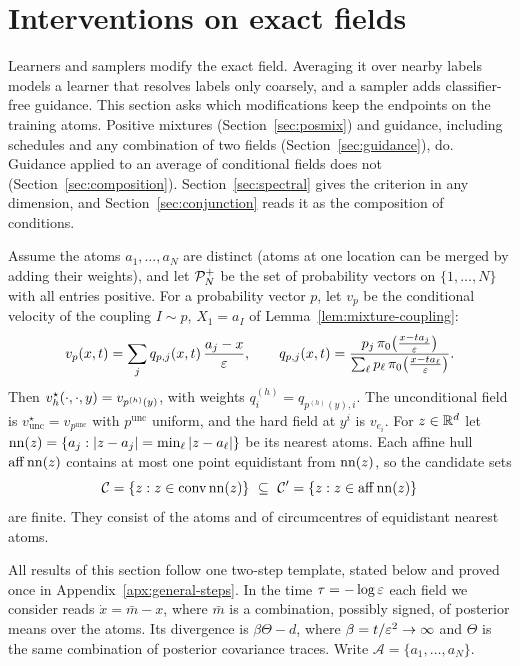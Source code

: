\documentclass{article} %
\theoremstyle{plain}
\theoremstyle{definition}
\theoremstyle{remark}
\begin{document}
\section{Interventions on exact fields}
\label{sec:intervention-atomicity}

Learners and samplers modify the exact field. Averaging it over nearby labels models a learner
that resolves labels only coarsely, and a sampler adds classifier-free guidance. This section asks
which modifications keep the endpoints on the training atoms. Positive mixtures
(Section~\ref{sec:posmix}) and guidance, including schedules and any combination of two fields
(Section~\ref{sec:guidance}), do. Guidance applied to an average of conditional fields does not
(Section~\ref{sec:composition}). Section~\ref{sec:spectral} gives the criterion in any dimension,
and Section~\ref{sec:conjunction} reads it as the composition of conditions.

Assume the atoms $a_1,\dots,a_N$ are distinct (atoms at one location can be merged by adding
their weights), and let $\mathcal{P}_N^{+}$ be the set of probability vectors on $\{1,\dots,N\}$ with all
entries positive. For a probability vector $p$, let $v_p$ be the conditional velocity of the
coupling $I\sim p$, $X_1=a_I$ of Lemma~\ref{lem:mixture-coupling}:
\begin{equation}
v_p(x,t)=\sum_j q_{p,j}(x,t)\,\frac{a_j-x}{\varepsilon},\qquad
q_{p,j}(x,t)=\frac{p_j\,\pi_0\big(\tfrac{x-ta_j}{\varepsilon}\big)}
{\sum_\ell p_\ell\,\pi_0\big(\tfrac{x-ta_\ell}{\varepsilon}\big)}.
\label{eq:prior-field}
\end{equation}
Then $v_h^\star(\cdot,\cdot,y)=v_{p^{(h)}(y)}$, with weights $q^{(h)}_i=q_{p^{(h)}(y),i}$. The
unconditional field is $v_{\mathrm{unc}}^\star=v_{p^{\mathrm{unc}}}$ with $p^{\mathrm{unc}}$ uniform,
and the hard field at $y^i$ is $v_{e_i}$. For $z\in\mathbb{R}^d$ let $\operatorname{nn}(z)=\{a_j:|z-a_j|=\min_\ell|z-a_\ell|\}$ be its
nearest atoms. Each affine hull $\operatorname{aff}\operatorname{nn}(z)$ contains at most one point
equidistant from $\operatorname{nn}(z)$, so the candidate sets
\begin{equation}
\mathcal C=\{z:z\in\operatorname{conv}\operatorname{nn}(z)\}\ \subseteq\ \mathcal C'=\{z:z\in\operatorname{aff}\operatorname{nn}(z)\}
\label{eq:candidates}
\end{equation}
are finite. They consist of the atoms and of circumcentres of equidistant nearest atoms.

All results of this section follow one two-step template, stated below and proved once in
Appendix~\ref{apx:general-steps}. In the time $\tau=-\log\varepsilon$ each field we consider reads
$\dot x=\bar m-x$, where $\bar m$ is a combination, possibly signed, of posterior means over the
atoms. Its divergence is $\beta\Theta-d$, where $\beta=t/\varepsilon^2\to\infty$ and $\Theta$ is the same
combination of posterior covariance traces. Write $\mathcal A=\{a_1,\dots,a_N\}$.
\end{document}
